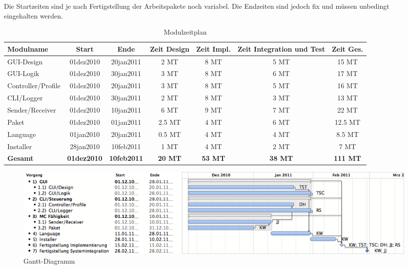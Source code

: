 \begin{landscape}

Die Startzeiten sind je nach Fertigstellung der Arbeitspakete noch variabel. Die Endzeiten sind jedoch fix und müssen unbedingt eingehalten werden.
\begin{table}[h]
\caption{Modulzeitplan}
\label{tab:modz}
\begin{center}
\begin{tabular}{|l|c|c|c|c|c|c|}
\hline
\textbf{Modulname} & \textbf{Start} & \textbf{Ende} & \textbf{Zeit Design} & \textbf{Zeit Impl.} & \textbf{Zeit Integration und Test} & \textbf{Zeit Ges.}\\
\hline
GUI-Design & 01dez2010 & 20jan2011 & 2 MT & 8 MT & 5 MT & 15 MT\\
\hline
GUI-Logik &  01dez2010 & 30jan2011 & 3 MT & 8 MT & 6 MT & 17 MT\\
\hline
Controller/Profile &  01dez2010 & 20jan2011 & 3 MT & 8 MT & 5 MT & 16 MT\\
\hline
CLI/Logger &  01dez2010 & 30jan2011 & 2 MT & 8 MT & 3 MT & 13 MT\\
\hline
Sender/Receiver & 01dez2010 & 10jan2011 & 6 MT & 9 MT & 7 MT & 22 MT\\
\hline
Paket & 01dez2010 & 01jan2011 & 2.5 MT & 4 MT & 6 MT & 12.5 MT\\
\hline
Language &  01jan2010 & 20jan2011 & 0.5 MT & 4 MT & 4 MT & 8.5 MT\\
\hline
Installer &  28jan2010 & 10feb2011 & 1 MT & 4 MT & 2 MT & 7 MT\\
\hline
\textbf{Gesamt} & \textbf{01dez2010} & \textbf{10feb2011} & \textbf{20 MT} & \textbf{53 MT} & \textbf{38 MT} & \textbf{111 MT}\\
\hline
\end{tabular}
\end{center}
\label{default}
\end{table}
\end{landscape}

\clearpage

\begin{landscape}
\begin{figure}
\centering
\includegraphics[width=22cm]{images/Modul-Gantt.png}
\caption{Gantt-Diagramm}\label{fig:gantt}
\end{figure}
\end{landscape}

